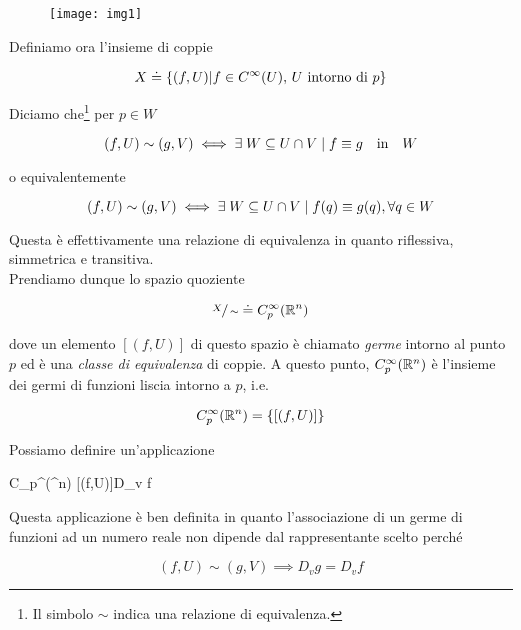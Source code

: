 \begin{figure}[H]
	\centering
	\texttt{[image: img1]}
\end{figure}

Definiamo ora l'insieme di coppie

\begin{equation}
	X \doteq \left\{ (f,U) \middle| f \in C^{\infty}(U), \, \text{$ U $ intorno di $ p $} \right\}
\end{equation}

Diciamo che\footnote{%
	Il simbolo $ \sim $ indica una relazione di equivalenza.%
} per $ p \in W $

\begin{equation}
	(f,U) \sim (g,V) \iff \E W \subseteq U \cap V \mid f \equiv g \qq{in} W
\end{equation}

o equivalentemente

\begin{equation}
	(f,U) \sim (g,V) \iff \exists \; W \subseteq U \cap V \mid f(q) \equiv g(q), \forall q \in W
\end{equation}

Questa è effettivamente una relazione di equivalenza in quanto riflessiva, simmetrica e transitiva.\\
Prendiamo dunque lo spazio quoziente

\begin{equation}
	\sfrac{X}{\sim} \doteq C_{p}^{\infty}(\mathbb{R}^{n})
\end{equation}

dove un elemento $ [(f,U)] $ di questo spazio è chiamato \textit{germe} intorno al punto $ p $ ed è una \textit{classe di equivalenza} di coppie. A questo punto, $ C_{p}^{\infty}(\mathbb{R}^{n}) $ è l'insieme dei germi di funzioni liscia intorno a $ p $, i.e.

\begin{equation}
	C_{p}^{\infty}(\mathbb{R}^{n}) = \left\{ [(f,U)] \right\}
\end{equation} 

Possiamo definire un'applicazione

%
	{C_{p}^{\infty}(\R^{n})}{\R}%
	{[(f,U)]}{D_{v} f}

Questa applicazione è ben definita in quanto l'associazione di un germe di funzioni ad un numero reale non dipende dal rappresentante scelto perché

\begin{equation}
	(f,U) \sim (g,V) \implies D_{v} g = D_{v} f
\end{equation}


